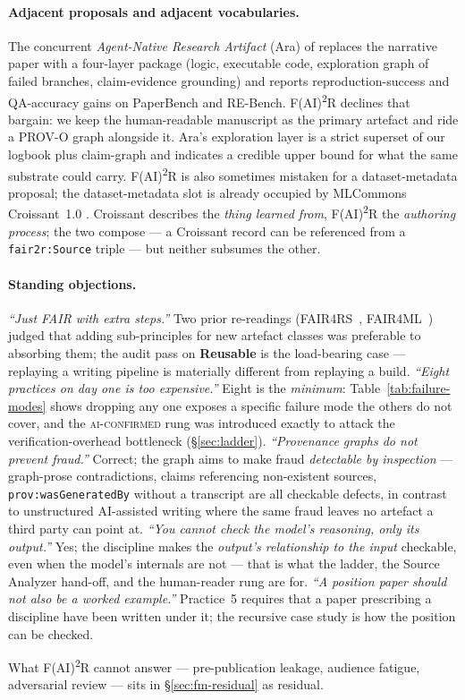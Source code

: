 \paragraph{Adjacent proposals and adjacent vocabularies.}
The concurrent \emph{Agent-Native Research Artifact} (Ara) of
\textcite{liu2026ara} replaces the narrative paper with a
four-layer package (logic, executable code, exploration graph of
failed branches, claim-evidence grounding) and reports
reproduction-success and QA-accuracy gains on PaperBench and
RE-Bench. F(AI)\textsuperscript{2}R declines that bargain: we
keep the human-readable manuscript as the primary artefact and
ride a PROV-O graph alongside it. Ara's exploration layer is a
strict superset of our logbook plus claim-graph and indicates a
credible upper bound for what the same substrate could carry.
F(AI)\textsuperscript{2}R is also sometimes mistaken for a
dataset-metadata proposal; the dataset-metadata slot is already
occupied by MLCommons Croissant~1.0
\cite{benjelloun2024croissant}. Croissant describes the
\emph{thing learned from}, F(AI)\textsuperscript{2}R the
\emph{authoring process}; the two compose --- a Croissant record
can be referenced from a \texttt{fair2r:Source} triple --- but
neither subsumes the other.

\paragraph{Standing objections.}
\emph{``Just FAIR with extra steps.''} Two prior re-readings
(FAIR4RS~\cite{chuehong2022fair4rs},
FAIR4ML~\cite{ravi2024fair4ml}) judged that adding sub-principles
for new artefact classes was preferable to absorbing them; the
audit pass on \textbf{Reusable} is the load-bearing case ---
replaying a writing pipeline is materially different from replaying
a build.
\emph{``Eight practices on day one is too expensive.''} Eight is
the \emph{minimum}: Table~\ref{tab:failure-modes} shows dropping
any one exposes a specific failure mode the others do not cover,
and the \textsc{ai-confirmed} rung was introduced exactly to
attack the verification-overhead bottleneck (\S\ref{sec:ladder}).
\emph{``Provenance graphs do not prevent fraud.''} Correct; the
graph aims to make fraud \emph{detectable by inspection} ---
graph-prose contradictions, claims referencing non-existent
sources, \texttt{prov:wasGeneratedBy} without a transcript are all
checkable defects, in contrast to unstructured AI-assisted writing
where the same fraud leaves no artefact a third party can point
at.
\emph{``You cannot check the model's reasoning, only its
output.''} Yes; the discipline makes the \emph{output's
relationship to the input} checkable, even when the model's
internals are not --- that is what the ladder, the Source
Analyzer hand-off, and the human-reader rung are for.
\emph{``A position paper should not also be a worked example.''}
Practice~5 requires that a paper prescribing a discipline have
been written under it; the recursive case study is how the
position can be checked.

\smallskip\noindent
What F(AI)\textsuperscript{2}R cannot answer --- pre-publication
leakage, audience fatigue, adversarial review --- sits in
\S\ref{sec:fm-residual} as residual.
